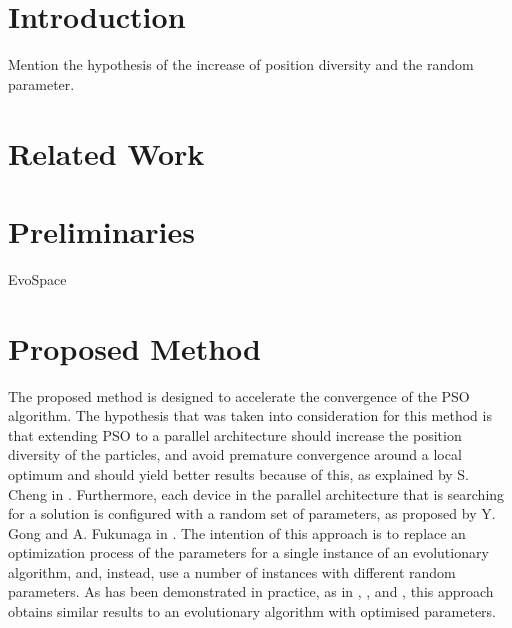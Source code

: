 \documentclass[runningheads,a4paper]{llncs}
\begin{document}
\begin{abstract}


\end{abstract}


\section{Introduction}
\label{introduction}

Mention the hypothesis of the increase of position diversity and the random parameter.

\section{Related Work}
\label{related-work}

\section{Preliminaries}
\label{preliminaries}

EvoSpace

\section{Proposed Method}
\label{proposed-method}

The proposed method is designed to accelerate the convergence of the
PSO algorithm. The hypothesis that was taken into consideration for this method is
that extending PSO to a parallel architecture should increase the
position diversity of the particles, and avoid premature convergence around a local
optimum and should yield better results because of this, as explained
by S. Cheng in \cite{cheng2013population}. Furthermore, each device in the parallel
architecture that is searching for a solution is configured with a
random set of parameters, as proposed by Y. Gong and
A. Fukunaga in \cite{gong2011distributed}. The intention of this approach is to
replace an optimization process of the parameters for a single instance of
an evolutionary algorithm, and, instead, use a number of instances with
different random parameters.  %
As has been demonstrated in practice, as
in \cite{garcia2014randomized}, \cite{gong2011distributed}, and
\cite{tanabe2013evaluation}, this approach obtains similar results to
an evolutionary algorithm with optimised parameters. %
\end{document}
